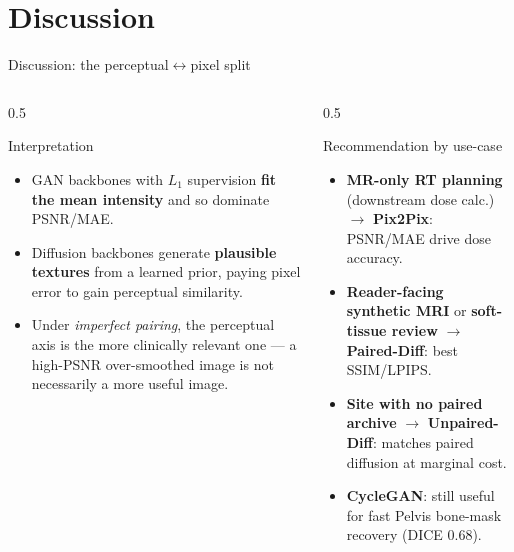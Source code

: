 \documentclass[aspectratio=169,10pt]{beamer}
\begin{document}
\section{Discussion}
\begin{frame}{Discussion: the perceptual$\leftrightarrow$pixel split}
\begin{columns}[T]
\begin{column}{0.5\textwidth}
\begin{block}{Interpretation}
\footnotesize
\begin{itemize}
    \item GAN backbones with $L_1$ supervision \textbf{fit the mean intensity} and so dominate PSNR/MAE.
    \item Diffusion backbones generate \textbf{plausible textures} from a learned prior, paying pixel error to gain perceptual similarity.
    \item Under \emph{imperfect pairing}, the perceptual axis is the more clinically relevant one --- a high-PSNR over-smoothed image is not necessarily a more useful image.
\end{itemize}
\end{block}
\end{column}
\begin{column}{0.5\textwidth}
\begin{exampleblock}{Recommendation by use-case}
\footnotesize
\begin{itemize}
    \item \textbf{MR-only RT planning} (downstream dose calc.) $\rightarrow$ \textbf{Pix2Pix}: PSNR/MAE drive dose accuracy.
    \item \textbf{Reader-facing synthetic MRI} or \textbf{soft-tissue review} $\rightarrow$ \textbf{Paired-Diff}: best SSIM/LPIPS.
    \item \textbf{Site with no paired archive} $\rightarrow$ \textbf{Unpaired-Diff}: matches paired diffusion at marginal cost.
    \item \textbf{CycleGAN}: still useful for fast Pelvis bone-mask recovery (DICE $0.68$).
\end{itemize}
\end{exampleblock}
\end{column}
\end{columns}
\end{frame}
\end{document}
